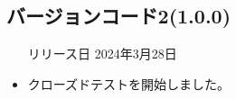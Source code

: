 \subsection*{バージョンコード2(1.0.0)}
\begin{itemize}
    \item[リリース日] 2024年3月28日
\end{itemize}

\new
\begin{itemize}
    \item クローズドテストを開始しました。
\end{itemize}

\change \par
\fix